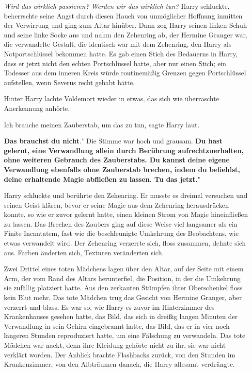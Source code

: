 \emph{Wird das wirklich passieren? Werden wir das wirklich tun?}
Harry schluckte, beherrschte seine Angst durch diesen Hauch von unmöglicher
Hoffnung inmitten der Verwirrung und ging zum Altar hinüber. Dann zog Harry
seinen linken Schuh und seine linke Socke aus und nahm den Zehenring ab, der
Hermine Granger war, die verwandelte Gestalt, die identisch war mit dem
Zehenring, den Harry als Notportschlüssel bekommen hatte. Es gab einen Stich des
Bedauerns in Harry, dass er jetzt nicht den echten Portschlüssel hatte, aber nur
einen Stich; ein Todesser aus dem inneren Kreis würde routinemäßig Grenzen gegen
Portschlüssel aufstellen, wenn Severus recht gehabt hätte.

Hinter Harry lachte Voldemort wieder in etwas, das sich wie überraschte
Anerkennung anhörte.

\glqq{}Ich brauche meinen Zauberstab, um das zu tun\grqq{}, sagte Harry laut.

\glqq{}\textbf{Das brauchst du nicht}." Die Stimme war hoch und grausam. \glqq
\textbf{Du hast gelernt, eine Verwandlung allein durch Berührung
aufrechtzuerhalten, ohne weiteren Gebrauch des Zauberstabs. Du kannst deine
eigene Verwandlung ebenfalls ohne Zauberstab brechen, indem du befiehlst, deine
erhaltende Magie abfließen zu lassen. Tu das jetzt.}"

Harry schluckte und berührte den Zehenring. Er musste es dreimal versuchen und
seinen Geist klären, bevor er seine Magie aus dem Zehenring herausdrücken
konnte, so wie er zuvor gelernt hatte, einen kleinen Strom von Magie
hineinfließen zu lassen. Das Brechen des Zaubers ging auf diese Weise viel
langsamer als ein Finite Incantatem, fast wie die beschleunigte Umkehrung des
Beobachtens, wie etwas verwandelt wird. Der Zehenring verzerrte sich, floss
zusammen, dehnte sich aus. Farben änderten sich, Texturen veränderten sich.

Zwei Drittel eines toten Mädchens lagen über den Altar, auf der Seite mit einem
Arm, der vom Rand des Altars herunterfiel, die Position, in der die Umkehrung
sie zufällig platziert hatte. Aus den zerkauten Stümpfen ihrer Oberschenkel
floss kein Blut mehr. Das tote Mädchen trug das Gesicht von Hermine Granger,
aber verzerrt und blass. Es war so, wie Harry es zuvor im Hinterzimmer des
Krankenhauses gesehen hatte, das Bild, das sich in dreißig langen Minuten der
Verwandlung in sein Gehirn eingebrannt hatte, das Bild, das er in vier noch
längeren Stunden reproduziert hatte, um eine Fälschung zu verwandeln. Das tote
Mädchen war nackt, denn ihre Kleidung gehörte nicht zu ihr, sie war nicht
verklärt worden. Der Anblick brachte Flashbacks zurück, von den Stunden im
Krankenzimmer, von den Albträumen danach, die Harry allesamt verdrängte.

